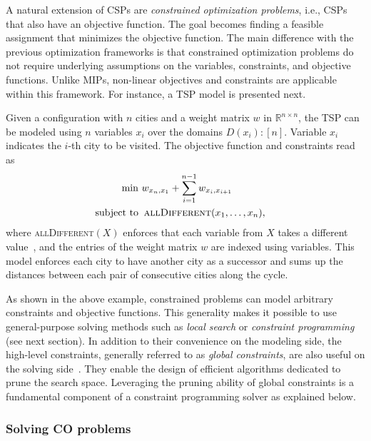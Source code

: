 \documentclass[twoside,11pt]{article}
\begin{document}
A natural extension of CSPs are \textit{constrained optimization problems}, i.e., CSPs that also have an objective function. The goal becomes finding a feasible assignment that minimizes the objective function. The main difference with the previous optimization frameworks is that constrained optimization problems do not require underlying assumptions on the variables, constraints, and objective functions. Unlike MIPs, non-linear objectives and constraints are applicable within this framework. For instance, a TSP model is presented next.

\begin{example}
\label{ex:cp}
Given a configuration with $n$ cities and a  weight matrix $w$ in $\mathbb{R}^{n \times n}$, the TSP can be modeled using $n$ variables $x_i$ over the domains $D(x_i) \colon [n]$. %
	Variable $x_i$ indicates the  $i$-th city to be visited. The objective function and constraints read as
	\label{ex:cp-tsp}
	\begin{align*}
		\min                 & \,\, w_{x_{n},x_{1}} + \sum_{i=1}^{n-1} w_{x_i,x_{i+1}} &  & \\
		\mathrm{subject\ to} & \;\; \textsc{allDifferent}(x_1,\dots,x_n),              &  &
	\end{align*}
	where \textsc{allDifferent}$(X)$  enforces that each variable from $X$ takes a different value~\citep{regin1994filtering}, and the entries of the weight matrix $w$ are indexed using variables.
	This model enforces each city to have another city as a successor and sums up the distances between each pair of consecutive cities along the cycle.
\end{example}

As shown in the above example, constrained problems can model arbitrary constraints and objective functions.
This generality makes it possible to use general-purpose solving methods such as \emph{local search} or \emph{constraint programming} (see next section).
In addition to their convenience on the modeling side, the high-level constraints, generally referred to as \textit{global constraints}, are also useful on the solving side~\citep{regin2004global}.
They enable the design of efficient algorithms dedicated to prune the search space.
Leveraging the pruning ability of global constraints is a fundamental component of a constraint programming solver as explained below.

\subsubsection{Solving CO problems}
\label{sec:algo}
\end{document}
